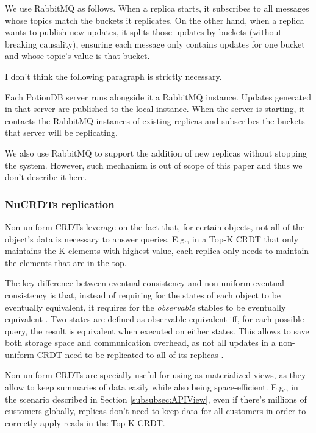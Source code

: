 \documentclass{vldb}
\newcommand{\grumbler}[2]{{\color{red}{\bf #1:} #2}}
\newcommand{\andre}[1]{\grumbler{andre}{#1}}
\begin{document}
We use RabbitMQ as follows.
When a replica starts, it subscribes to all messages whose topics match the buckets it replicates.
On the other hand, when a replica wants to publish new updates, it splits those updates by buckets (without breaking causality), ensuring each message only contains updates for one bucket and whose topic's value is that bucket.

\andre{I don't think the following paragraph is strictly necessary.}

Each PotionDB server runs alongside it a RabbitMQ instance.
Updates generated in that server are published to the local instance.
When the server is starting, it contacts the RabbitMQ instances of existing replicas and subscribes the buckets that server will be replicating.

We also use RabbitMQ to support the addition of new replicas without stopping the system.
However, such mechanism is out of scope of this paper and thus we don't describe it here.

\subsubsection{NuCRDTs replication}
\label{subsubsec:nureplication}

Non-uniform CRDTs \cite{???} leverage on the fact that, for certain objects, not all of the object's data is necessary to answer queries.
E.g., in a Top-K CRDT that only maintains the K elements with highest value, each replica only needs to maintain the elements that are in the top.

The key difference between eventual consistency and non-uniform eventual consistency is that, instead of requiring for the states of each object to be eventually equivalent, it requires for the \emph{observable} stables to be eventually equivalent \cite{???}.
Two states are defined as observable equivalent iff, for each possible query, the result is equivalent when executed on either states.
This allows to save both storage space and communication overhead, as not all updates in a non-uniform CRDT need to be replicated to all of its replicas \cite{???}.

Non-uniform CRDTs are specially useful for using as materialized views, as they allow to keep summaries of data easily while also being space-efficient.
E.g., in the scenario described in Section \ref{subsubsec:APIView}, even if there's millions of customers globally, replicas don't need to keep data for all customers in order to correctly apply reads in the Top-K CRDT.
\end{document}
